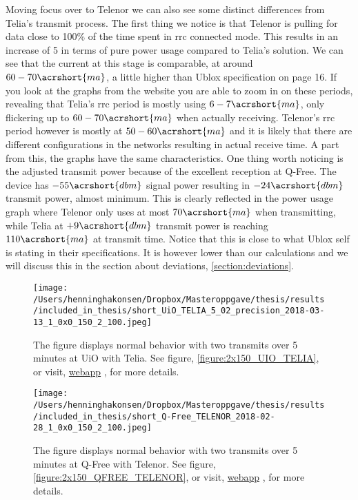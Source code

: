 \documentclass[USenglish]{ifimaster}  %
\begin{document}
Moving focus over to Telenor we can also see some distinct differences from Telia's transmit process. The first thing we notice is that Telenor is pulling for data close to 100\% of the time spent in \acrshort{rrc} connected mode. This results in an increase of 5 in terms of pure power usage compared to Telia's solution. We can see that the current at this stage is comparable, at around ${60-70 \acrshort{ma}}$, a little higher than Ublox specification on page 16\cite{datasheet:ubloxchip}. If you look at the graphs from the website you are able to zoom in on these periods, revealing that Telia's \acrshort{rrc} period is mostly using ${6-7 \acrshort{ma}}$, only flickering up to ${60-70 \acrshort{ma}}$ when actually receiving. Telenor's \acrshort{rrc} period however is mostly at ${50-60 \acrshort{ma}}$ and it is likely that there are different configurations in the networks resulting in actual receive time. A part from this, the graphs have the same characteristics. One thing worth noticing is the adjusted transmit power because of the excellent reception at Q-Free. The device has ${-55 \acrshort{dbm}}$ signal power resulting in ${-24 \acrshort{dbm}}$ transmit power, almost minimum. This is clearly reflected in the power usage graph where Telenor only uses at most ${70 \acrshort{ma}}$ when transmitting, while Telia at ${+9 \acrshort{dbm}}$ transmit power is reaching ${110 \acrshort{ma}}$ at transmit time. Notice that this is close to what Ublox self is stating in their specifications. It is however lower than our calculations and we will discuss this in the section about deviations, \vref{section:deviations}.

\begin{figure}[H]
  \centering
  \texttt{[image: /Users/henninghakonsen/Dropbox/Masteroppgave/thesis/results/included\_in\_thesis/short\_UiO\_TELIA\_5\_02\_precision\_2018-03-13\_1\_0x0\_150\_2\_100.jpeg]}
  \caption[Short-term test - normal behavior, Telia]{The figure displays normal behavior with two transmits over 5 minutes at UiO with Telia. See figure, \vref{figure:2x150_UIO_TELIA}, or visit, \href{http://158.39.77.97:9000/\#/results/Q-Free\_TELENOR\_2018-02-28\_1\_0x0\_150\_2\_100}{webapp} \cite{online:result1}, for more details.}
  \label{figure:2x150_UIO_TELIA_SHORT}
\end{figure}

\begin{figure}[H]
  \centering
  \texttt{[image: /Users/henninghakonsen/Dropbox/Masteroppgave/thesis/results/included\_in\_thesis/short\_Q-Free\_TELENOR\_2018-02-28\_1\_0x0\_150\_2\_100.jpeg]}
  \caption[Short-term test - normal behavior, Telenor]{The figure displays normal behavior with two transmits over 5 minutes at Q-Free with Telenor. See figure, \vref{figure:2x150_QFREE_TELENOR}, or visit, \href{http://158.39.77.97:9000/\#/results/Q-Free\_TELENOR\_5.02\_2018-03-07\_0\_0x0\_40\_1\_200}{webapp} \cite{online:result2}, for more details.}
  \label{figure:2x150_QFREE_TELENOR_SHORT}
\end{figure}
\end{document}
